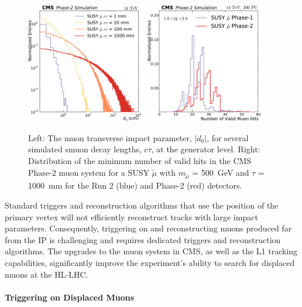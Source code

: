 \begin{figure}[t]\begin{center}
\includegraphics[width=0.47\textwidth]{figures/Stage0h1_0_d0_smuon_daughter}
\includegraphics[width=0.47\textwidth]{figures/MuonHitsEndcap}
\caption{
Left: The muon transverse impact parameter, $|d_{0}|$, for several simulated smuon decay lengths, $c\tau$, at the generator level.
Right: Distribution of the minimum number of valid hits in the CMS Phase-2 muon system for a SUSY $\widetilde{\mu}$ with $m_{\widetilde{\mu}}$ = 500~GeV and $\tau$ = 1000~mm for the Run 2 (blue) and Phase-2 (red) detectors.
}
\label{fig:perfDisplaced}
\end{center}
\end{figure}

Standard triggers and reconstruction algorithms that use the position of the primary vertex will not efficiently reconstruct tracks with large impact parameters. Consequently, triggering on and reconstructing muons produced far  from the IP is challenging and requires dedicated triggers and reconstruction algorithms. The upgrades to the muon system in CMS, as well as the L1 tracking capabilities, significantly improve the experiment's ability to search for displaced muons at the HL-LHC.

\paragraph{Triggering on Displaced Muons}

